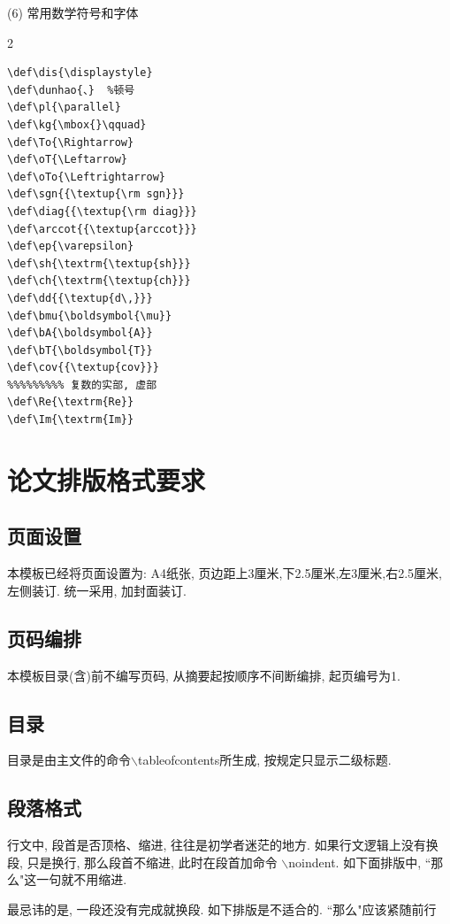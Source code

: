 \documentclass[a4paper,12pt,twoside]{ctexart}
\begin{document}
\vspace*{-10pt}
(6) 常用数学符号和字体\vspace*{-10pt}
\begin{multicols}{2}
\begin{verbatim}
\def\dis{\displaystyle}
\def\dunhao{、}  %顿号
\def\pl{\parallel}
\def\kg{\mbox{}\qquad}
\def\To{\Rightarrow}
\def\oT{\Leftarrow}
\def\oTo{\Leftrightarrow}
\def\sgn{{\textup{\rm sgn}}}
\def\diag{{\textup{\rm diag}}}
\def\arccot{{\textup{arccot}}}
\def\ep{\varepsilon}
\def\sh{\textrm{\textup{sh}}}
\def\ch{\textrm{\textup{ch}}}
\def\dd{{\textup{d\,}}}
\def\bmu{\boldsymbol{\mu}}
\def\bA{\boldsymbol{A}}
\def\bT{\boldsymbol{T}}
\def\cov{{\textup{cov}}}
%%%%%%%%% 复数的实部, 虚部
\def\Re{\textrm{Re}}
\def\Im{\textrm{Im}}
\end{verbatim}
\end{multicols}\vspace{-10pt}


\section{论文排版格式要求}
    \subsection{页面设置}
    本模板已经将页面设置为: A4纸张, 页边距上3厘米,下2.5厘米,左3厘米,右2.5厘米, 左侧装订. 统一采用, 加封面装订.
    \subsection{页码编排}
    本模板目录(含)前不编写页码, 从摘要起按顺序不间断编排, 起页编号为1.
    \subsection{目录}
    目录是由主文件的命令$\backslash$tableofcontents所生成, 按规定只显示二级标题.
    \subsection{段落格式}
    行文中, 段首是否顶格、缩进, 往往是初学者迷茫的地方. 如果行文逻辑上没有换段, 只是换行, 那么段首不缩进, 此时在段首加命令
    $\backslash$noindent. 如下面排版中, ``那么"这一句就不用缩进. \\[10pt]

    最忌讳的是, 一段还没有完成就换段. 如下排版是不适合的. ``那么"应该紧随前行\\[10pt]
\end{document}
